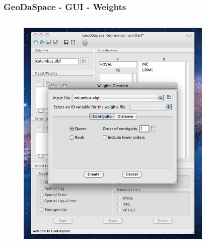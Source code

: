 \documentclass[nototal]{beamer}
\begin{document}
\begin{frame}
	\frametitle{GeoDaSpace - GUI - Weights}
  \begin{columns}
  \begin{column}{0.5\linewidth}
  \begin{figure}
  \includegraphics[width=1.00\linewidth]{figs/gs3-create.png}
  \end{figure}
  \end{column}
  \begin{column}{0.5\linewidth}
  \begin{figure}

\end{figure}
\end{column}
\end{columns}
\end{frame}
\end{document}
